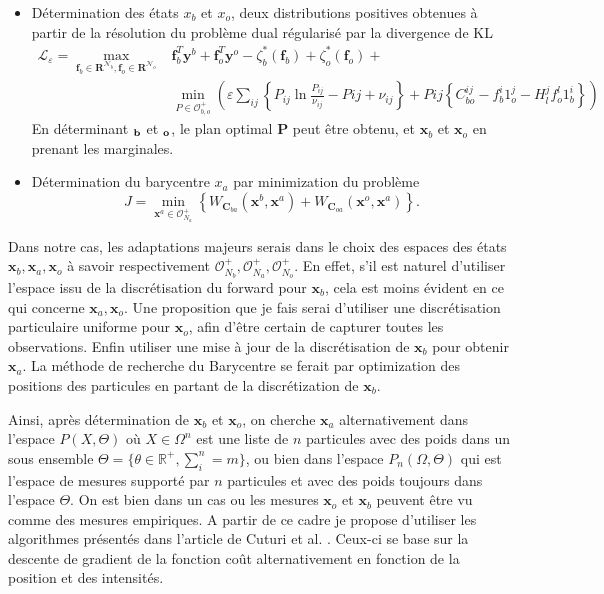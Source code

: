 \documentclass{article}
\newcommand{\bbf}{\bm{f}}
\newcommand{\bR}{\bm{R}}
\newcommand{\bC}{\bm{C}}
\newcommand{\bx}{\bm{x}}
\newcommand{\by}{\bm{y}}
\begin{document}
\begin{itemize}
    \item Détermination des états $x_b$ et $x_o$, deux distributions positives obtenues à partir de la résolution du problème dual régularisé par la divergence de KL
          \begin{equation*}
              \begin{split}
                  \mathcal L_{\varepsilon} = \max_{\bbf_b \in \bR^{\mathcal N_b}, \bbf_o \in \bR^{\mathcal N_o}} &  \bbf_b^T \by^b + \bbf_o^T \by^o - \zeta^*_b(\bbf_b) + \zeta^*_o(\bbf_o) + \\  &\min_{P \in \mathcal{O}^+_{b,o}}\left(\varepsilon \sum_{ij} \left\{P_{ij} \ln{\frac{P_{ij}}{\nu_{ij}} - P{ij} + \nu_{ij}}\right\} + P{ij} \left\{C_{bo}^{ij} - f_b^i 1_o^j - H_l^j f_o^l 1_b^i \right\}\right)
              \end{split}
          \end{equation*}
          En déterminant $\bf_b$ et $\bf_o$, le plan optimal $\bm{P}$ peut être obtenu, et $\bx_b$ et $\bx_o$ en prenant les marginales.
    \item Détermination du barycentre $x_a$ par minimization du problème
          \begin{equation*}
              J = \min_{\bx^a \in \mathcal O^+_{N_a}} \left\{W_{\bC_{ba}}(\bx^b, \bx^a) + W_{\bC_{oa}}(\bx^o, \bx^a)\right\}.
          \end{equation*}
\end{itemize}
Dans notre cas, les adaptations majeurs serais dans le choix des espaces des états $\bx_b, \bx_a, \bx_o$ à savoir respectivement $\mathcal O^+_{N_b},\mathcal O^+_{N_a},\mathcal O^+_{N_o}$.
En effet, s'il est naturel d'utiliser l'espace issu de la discrétisation du forward pour $\bx_b$, cela est moins évident en ce qui concerne $\bx_a, \bx_o$.
Une proposition que je fais serai d'utiliser une discrétisation particulaire uniforme pour $\bx_o$, afin d'être certain de capturer toutes les observations. Enfin utiliser une mise à jour de la discrétisation de $\bx_b$ pour obtenir $\bx_a$. La méthode de recherche du Barycentre se ferait par optimization des positions des particules en partant de la discrétization de $\bx_b$.

Ainsi, après détermination de $\bx_b$ et $\bx_o$, on cherche $\bx_a$ alternativement dans l'espace $P(X, \Theta)$ où $X \in \Omega^n $ est une liste de $n$ particules avec des poids dans un sous ensemble $\Theta = \{\theta \in \mathbb{R^+}, \sum_i^{n} = m\}$, ou bien dans l'espace $P_n(\Omega, \Theta)$ qui est l'espace de mesures supporté par $n$ particules et avec des poids toujours dans l'espace $\Theta$.
On est bien dans un cas ou les mesures $\bx_o$ et $\bx_b$ peuvent être vu comme des mesures empiriques.
A partir de ce cadre je propose d'utiliser les algorithmes présentés dans l'article de Cuturi et al. \cite{cuturi_fast_2014}. Ceux-ci se base sur la descente de gradient de la fonction coût alternativement en fonction de la position et des intensités.
\end{document}
